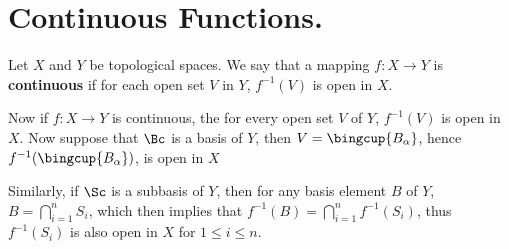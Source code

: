 
\section{Continuous Functions.}

\begin{definition}
    Let $X$ and  $Y$ be topological spaces. We say that a mapping $f:X
    \rightarrow Y$ is  \textbf{continuous} if for each open set $V$ in  $Y$,
    $f^{-1}(V)$ is open in $X$.
\end{definition}

Now if $f:X \rightarrow Y$ is continuous, the for every open set  $V$ of  $Y$,
$f^{-1}(V)$ is open in  $X$. Now suppose that  $\Bc$ is a basis of  $Y$, then
$V=\bingcup{B_{\alpha}}$, hence $f^{-1}(\bingcup{B_{\alpha}})$, is open in $X$

Similarly, if $\Sc$ is a subbasis of  $Y$, then for any basis element  $B$ of
$Y$,  $B=\bigcap_{i=1}^{n}{S_i}$, which then implies that
$f^{-1}(B)=\bigcap_{i=1}^{n}{f^{-1}(S_i)}$, thus $f^{-1}(S_i)$ is also open in
$X$ for $1 \leq i \leq n$.

